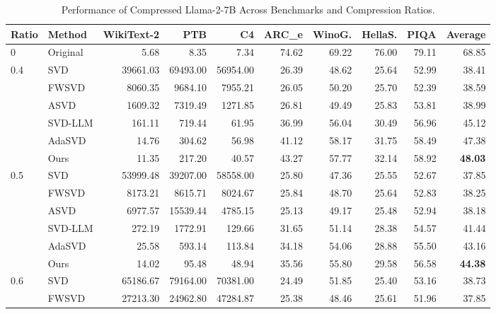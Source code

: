 
\begin{table}[h]
  \centering
  \small
  \caption{Performance of Compressed Llama-2-7B Across Benchmarks and Compression Ratios.}
  \begin{tabular}{llrrrrrrrr}
    \toprule
    Ratio & Method & WikiText-2 & PTB & C4 & ARC\_e & WinoG. & HellaS. & PIQA & Average \\
    \midrule
    0   & Original & 5.68  & 8.35   & 7.34   & 74.62 & 69.22 & 76.00 & 79.11 & 68.85 \\
    \midrule
    \multirow{6}{*}{0.4}
      & SVD       & 39661.03 & 69493.00 & 56954.00 & 26.39 & 48.62 & 25.64 & 52.99 & 38.41 \\
      & FWSVD     & 8060.35  & 9684.10  & 7955.21  & 26.05 & 50.20 & 25.70 & 52.39 & 38.59 \\
      & ASVD      & 1609.32  & 7319.49  & 1271.85  & 26.81 & 49.49 & 25.83 & 53.81 & 38.99 \\
      & SVD-LLM   & 161.11   & 719.44   & 61.95    & 36.99 & 56.04 & 30.49 & 56.96 & 45.12 \\
      & AdaSVD    & 14.76    & 304.62   & 56.98    & 41.12 & 58.17 & 31.75 & 58.49 & 47.38 \\
      \rowcolor{gray!12}
      & Ours      & 11.35    & 217.20   & 40.57    & 43.27 & 57.77 & 32.14 & 58.92 & \textbf{48.03} \\
    \midrule
    \multirow{6}{*}{0.5}
      & SVD       & 53999.48 & 39207.00 & 58558.00 & 25.80 & 47.36 & 25.55 & 52.67 & 37.85 \\
      & FWSVD     & 8173.21  & 8615.71  & 8024.67  & 25.84 & 48.70 & 25.64 & 52.83 & 38.25 \\
      & ASVD      & 6977.57  & 15539.44 & 4785.15  & 25.13 & 49.17 & 25.48 & 52.94 & 38.18 \\
      & SVD-LLM   & 272.19   & 1772.91  & 129.66   & 31.65 & 51.14 & 28.38 & 54.57 & 41.44 \\
      & AdaSVD    & 25.58    & 593.14   & 113.84   & 34.18 & 54.06 & 28.88 & 55.50 & 43.16 \\
      \rowcolor{gray!12}
      & Ours      & 14.02    & 95.48    & 48.94    & 35.56 & 55.80 & 29.58 & 56.58 & \textbf{44.38} \\
    \midrule
    \multirow{6}{*}{0.6}
      & SVD       & 65186.67 & 79164.00 & 70381.00 & 24.49 & 51.85 & 25.40 & 53.16 & 38.73 \\
      & FWSVD     & 27213.30 & 24962.80 & 47284.87 & 25.38 & 48.46 & 25.61 & 51.96 & 37.85 \\

\end{tabular}
\end{table}
